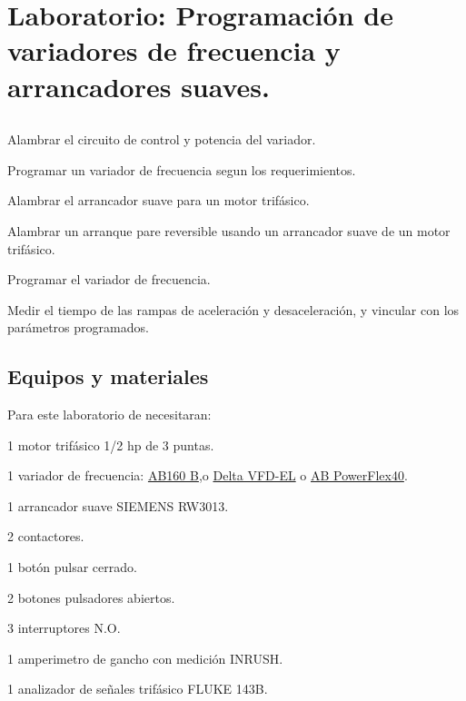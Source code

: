 \chapter{Laboratorio:  Programación de variadores de frecuencia y arrancadores suaves.}

\section{\obj}
\capacidad
\begin{itemize}
	{\small
    \item  Alambrar el circuito de control y potencia del variador.
    \item  Programar un variador de frecuencia segun los requerimientos. 
	\item Alambrar el arrancador suave para un motor trifásico.
	\item Alambrar un arranque pare reversible usando un arrancador suave de un motor trifásico.
	\item Programar el variador de frecuencia.
	\item Medir el tiempo de las rampas de aceleración y desaceleración, y vincular con los parámetros programados.
 }
\end{itemize} 

 
\section{Equipos y materiales}
Para este laboratorio de necesitaran:
\begin{itemize}
	{\small \item 1 motor trifásico 1/2 hp de 3 puntas.
	\item 1 variador de frecuencia: \href{https://es.scribd.com/doc/275521958/Manual-de-Usuario-Variador-de-Velocidad-Serie-B-Allen-Bradley}{AB160 B},o \href{https://es.scribd.com/document/264717107/Manual-Variador-Delta-VFD-EL}{Delta VFD-EL} o \href{https://www.rockwellautomation.com/search/ra-en-US;keyword=Powerflex%252040;startIndex=0;activeTab=Literature;spellingCorrect=true;facets=;languages=es,en;locales=es_GLOBAL,en_GLOBAL,en-US;sort=bma;isPLS=false;sessionID=754c8ada-9fd8-989f-fc95-a7fb7a9d77bd;deepLinking=false}{AB PowerFlex40}.
	\item 1 arrancador suave SIEMENS RW3013.
	\item 2 contactores.
	\item 1 botón pulsar cerrado.
	\item 2 botones pulsadores abiertos.
	\item 3 interruptores N.O.
	\item 1 amperimetro de gancho con medición INRUSH.
	\item 1 analizador de señales trifásico FLUKE 143B.
}
\end{itemize}

